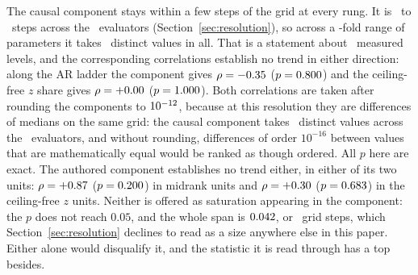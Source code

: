 The causal component stays within a few steps of the grid at every rung.
It is \CausalCompStepsMin\ to \CausalCompStepsMax\ steps across the
\TrendNEval\ evaluators (Section~\ref{sec:resolution}), so across
a \TrendCapSpan-fold range of parameters it takes
\CausalCompNDistinct\ distinct
values in all.  That is a statement about \TrendNEval\
measured levels, and the corresponding correlations establish no trend in
either direction: along the AR ladder the component gives $\rho =
-0.35$ ($p = 0.800$) and the ceiling-free $z$ share gives
$\rho = +0.00$ ($p = 1.000$).  Both
correlations are taken after rounding the components to $10^{-12}$,
because at this resolution they are differences of medians on the same grid:
the causal component takes \TrendCausalNDistinct\ distinct values across the
\TrendNEval\ evaluators, and without rounding, differences of order
$10^{-16}$ between values that are mathematically equal would be ranked as though ordered.  All $p$ here are exact.  The authored component establishes no trend
either, in either of its two units: $\rho = +0.87$ ($p =
0.200$) in midrank units and $\rho = +0.30$ ($p =
0.683$) in the ceiling-free $z$ units.  Neither is offered as
saturation appearing in the component: the $p$ does not reach $0.05$, and
the whole span is $0.042$, or
\AuthoredCompSpanSteps\ grid steps, which Section~\ref{sec:resolution}
declines to read as a size anywhere else in this paper.  Either alone would
disqualify it, and the statistic it is read through has a top besides.

